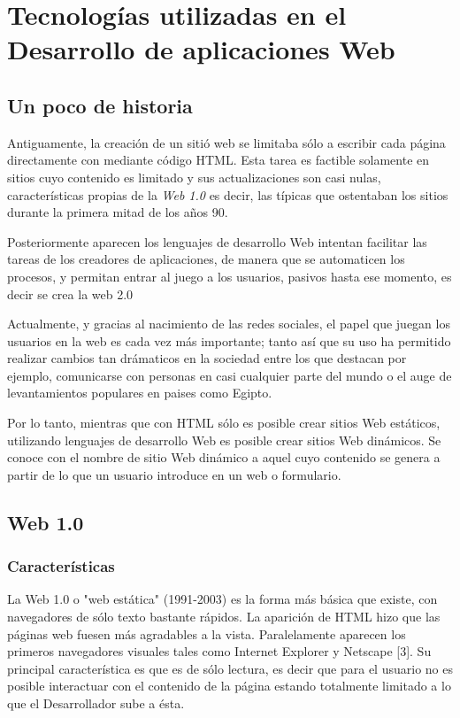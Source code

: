 \section{Tecnologías utilizadas en el Desarrollo de aplicaciones Web}
\subsection{Un poco de historia}
Antiguamente, la creación de un sitió web se limitaba sólo  a escribir cada página directamente con mediante
código HTML. Esta tarea es factible solamente en sitios cuyo contenido es limitado y sus actualizaciones son casi nulas,
características propias de la \textit{Web 1.0} es decir, las típicas  que ostentaban los sitios durante 
la primera mitad de los años 90. 

Posteriormente aparecen los lenguajes de desarrollo Web intentan facilitar las tareas de los creadores de aplicaciones, 
de manera que se automaticen los procesos, y permitan entrar al juego a los usuarios, pasivos hasta ese momento, es decir
se crea la web 2.0

Actualmente, y gracias al nacimiento de las redes sociales, el papel que juegan los usuarios en la web es cada vez
más importante; tanto así que su uso ha permitido realizar cambios tan drámaticos en la sociedad entre los que destacan
por ejemplo, comunicarse con personas en casi cualquier parte del mundo o el auge de levantamientos populares en paises como Egipto. 

Por lo tanto, mientras que con HTML sólo es posible crear sitios Web estáticos, utilizando lenguajes 
de desarrollo Web es posible crear sitios Web dinámicos. Se conoce con el nombre de sitio Web dinámico a aquel
cuyo contenido se genera a partir de lo que un usuario introduce en un web o formulario. 


\subsection{Web 1.0}
\subsubsection{Características}
La Web 1.0 o "web estática" (1991-2003) es la forma más básica 
que existe, con navegadores de sólo texto bastante rápidos. La aparición de HTML hizo que las páginas web fuesen más agradables 
a la vista. Paralelamente aparecen los primeros navegadores visuales tales como Internet Explorer y Netscape [3]. Su principal
característica es que es de sólo lectura, es decir que para el usuario no es posible interactuar con el contenido de la página 
estando totalmente limitado a lo que el Desarrollador sube a ésta.

